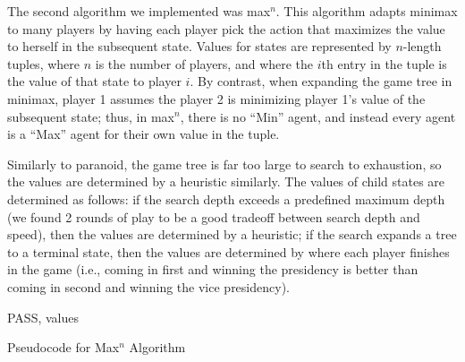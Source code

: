 \documentclass[11pt]{article}
\begin{document}
The second algorithm we implemented was max$^n$. This algorithm adapts minimax to many players by having each player pick the action that maximizes the value to herself in the subsequent state. Values for states are represented by $n$-length tuples, where $n$ is the number of players, and where the $i$th entry in the tuple is the value of that state to player $i$. By contrast, when expanding the game tree in minimax, player 1 assumes the player 2 is minimizing player 1's value of the subsequent state; thus, in max$^n$, there is no ``Min'' agent, and instead every agent is a ``Max'' agent for their own value in the tuple.

Similarly to paranoid, the game tree is far too large to search to exhaustion, so the values are determined by a heuristic similarly. The values of child states are determined as follows: if the search depth exceeds a predefined maximum depth (we found 2 rounds of play to be a good tradeoff between search depth and speed), then the values are determined by a heuristic; if the search expands a tree to a terminal state, then the values are determined by where each player finishes in the game (i.e., coming in first and winning the presidency is better than coming in second and winning the vice presidency).

\begin{algorithm}
  \begin{algorithmic}
      \State \Return PASS, values
    \EndIf
	\EndIf
      \EndFor
    \EndIf
    \EndIf
    \EndFor
  \end{algorithmic}
  \caption{Pseudocode for Max$^n$ Algorithm}
\end{algorithm}
\end{document}
